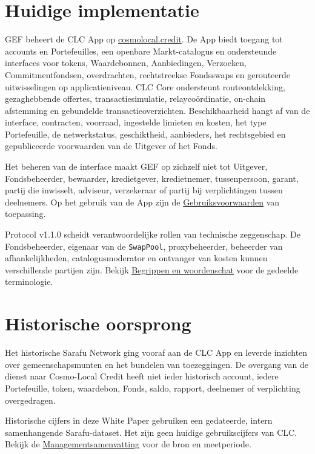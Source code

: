 \documentclass[11pt]{article}
\begin{document}
\section*{Huidige implementatie}

GEF beheert de CLC App op \href{https://cosmolocal.credit}{cosmolocal.credit}. De App biedt toegang tot accounts en Portefeuilles, een openbare Markt-catalogus en ondersteunde interfaces voor tokens, Waardebonnen, Aanbiedingen, Verzoeken, Commitmentfondsen, overdrachten, rechtstreekse Fondsswaps en gerouteerde uitwisselingen op applicatieniveau. CLC Core ondersteunt routeontdekking, gezaghebbende offertes, transactiesimulatie, relaycoördinatie, on-chain afstemming en gebundelde transactieoverzichten. Beschikbaarheid hangt af van de interface, contracten, voorraad, ingestelde limieten en kosten, het type Portefeuille, de netwerkstatus, geschiktheid, aanbieders, het rechtsgebied en gepubliceerde voorwaarden van de Uitgever of het Fonds.

Het beheren van de interface maakt GEF op zichzelf niet tot Uitgever, Fondsbeheerder, bewaarder, kredietgever, kredietnemer, tussenpersoon, garant, partij die inwisselt, adviseur, verzekeraar of partij bij verplichtingen tussen deelnemers. Op het gebruik van de App zijn de \href{https://docs.cosmolocal.credit/nl-BE/governance/terms}{Gebruiksvoorwaarden} van toepassing.

Protocol v1.1.0 scheidt verantwoordelijke rollen van technische zeggenschap. De Fondsbeheerder, eigenaar van de \texttt{SwapPool}, proxybeheerder, beheerder van afhankelijkheden, catalogusmoderator en ontvanger van kosten kunnen verschillende partijen zijn. Bekijk \href{https://docs.cosmolocal.credit/nl-BE/introduction/concepts}{Begrippen en woordenschat} voor de gedeelde terminologie.

\section*{Historische oorsprong}

Het historische Sarafu Network ging vooraf aan de CLC App en leverde inzichten over gemeenschapsmunten en het bundelen van toezeggingen. De overgang van de dienst naar Cosmo-Local Credit heeft niet ieder historisch account, iedere Portefeuille, token, waardebon, Fonds, saldo, rapport, deelnemer of verplichting overgedragen.

Historische cijfers in deze White Paper gebruiken een gedateerde, intern samenhangende Sarafu-dataset. Het zijn geen huidige gebruikscijfers van CLC. Bekijk de \href{https://docs.cosmolocal.credit/nl-BE/white-paper/executive-summary}{Managementsamenvatting} voor de bron en meetperiode.
\end{document}
